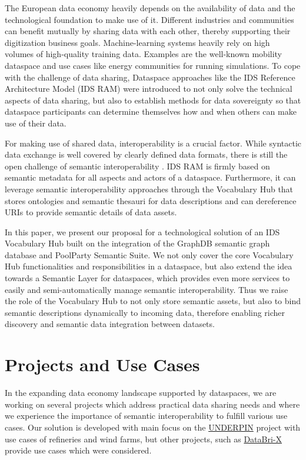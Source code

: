 \documentclass[
  super,
  preprint,
  3p]{elsarticle}
\begin{document}
The European data economy heavily depends on the availability of data
and the technological foundation to make use of it. Different industries
and communities can benefit mutually by sharing data with each other,
thereby supporting their digitization business goals. Machine-learning
systems heavily rely on high volumes of high-quality training data.
Examples are the well-known mobility dataspace and use cases like energy
communities for running simulations. To cope with the challenge of data
sharing, Dataspace approaches like the IDS Reference Architecture Model
(IDS RAM) were introduced to not only solve the technical aspects of
data sharing, but also to establish methods for data sovereignty so that
dataspace participants can determine themselves how and when others can
make use of their data.

For making use of shared data, interoperability is a crucial factor.
While syntactic data exchange is well covered by clearly defined data
formats, there is still the open challenge of semantic interoperability
\citep{woutervandenbergSemanticInteroperabilityData2024}. IDS RAM is
firmly based on semantic metadata for all aspects and actors of a
dataspace. Furthermore, it can leverage semantic interoperability
approaches through the Vocabulary Hub \citep{IDSARAMVocabulary2024} that
stores ontologies and semantic thesauri for data descriptions and can
dereference URIs to provide semantic details of data assets.

In this paper, we present our proposal for a technological solution of
an IDS Vocabulary Hub built on the integration of the GraphDB semantic
graph database and PoolParty Semantic Suite. We not only cover the core
Vocabulary Hub functionalities and responsibilities in a dataspace, but
also extend the idea towards a Semantic Layer for dataspaces, which
provides even more services to easily and semi-automatically manage
semantic interoperability. Thus we raise the role of the Vocabulary Hub
\citep{stornebrinkmichielVocabularyHubSemantic2023} to not only store
semantic assets, but also to bind semantic descriptions dynamically to
incoming data, therefore enabling richer discovery and semantic data
integration between datasets.

\section{Projects and Use Cases}\label{projects-and-use-cases}

In the expanding data economy landscape supported by dataspaces, we are
working on several projects which address practical data sharing needs
and where we experience the importance of semantic interoperability to
fulfill various use cases. Our solution is developed with main focus on
the \href{https://underpinproject.eu/}{UNDERPIN} project with use cases
of refineries and wind farms, but other projects, such as
\href{https://databri-x.eu/}{DataBri-X} provide use cases which were
considered.
\end{document}
